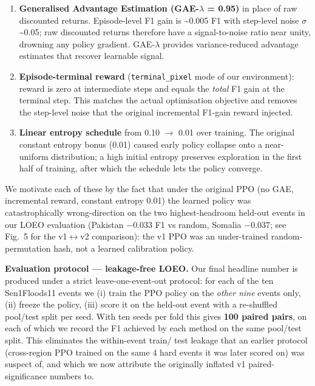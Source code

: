 \documentclass[sn-nature,lineno]{sn-jnl}
\providecommand{\tightlist}{\setlength{\itemsep}{0pt}\setlength{\parskip}{0pt}}
\theoremstyle{thmstyleone}
\theoremstyle{thmstyletwo}
\theoremstyle{thmstylethree}
\begin{document}
\begin{enumerate}
\def\labelenumi{\arabic{enumi}.}
\tightlist
\item
  \textbf{Generalised Advantage Estimation (GAE-$\lambda$ = 0.95)} \cite{schulman2016gae} in place of raw
  discounted returns. Episode-level F1 gain is \textasciitilde0.005 F1 with step-level
  noise $\sigma$ \textasciitilde0.05; raw discounted returns therefore have a signal-to-noise
  ratio near unity, drowning any policy gradient. GAE-$\lambda$ provides
  variance-reduced advantage estimates that recover learnable signal.
\item
  \textbf{Episode-terminal reward} (\texttt{terminal\_pixel} mode of our environment):
  reward is zero at intermediate steps and equals the \emph{total} F1 gain at
  the terminal step. This matches the actual optimisation objective and
  removes the step-level noise that the original incremental F1-gain
  reward injected.
\item
  \textbf{Linear entropy schedule} from 0.10 $\rightarrow$ 0.01 over training. The original
  constant entropy bonus (0.01) caused early policy collapse onto a
  near-uniform distribution; a high initial entropy preserves exploration
  in the first half of training, after which the schedule lets the policy
  converge.
\end{enumerate}

We motivate each of these by the fact that under the original PPO (no GAE,
incremental reward, constant entropy 0.01) the learned policy was
catastrophically wrong-direction on the two highest-headroom held-out events
in our LOEO evaluation (Pakistan $-$0.033 F1 vs random, Somalia $-$0.037; see
Fig.~5 for the v1$\leftrightarrow$v2 comparison): the v1 PPO was an
under-trained random-permutation hash, not a learned calibration policy.

\textbf{Evaluation protocol --- leakage-free LOEO.} Our final headline number is
produced under a strict leave-one-event-out protocol: for each of the ten
Sen1Floods11 events we (i) train the PPO policy on the \emph{other nine} events
only, (ii) freeze the policy, (iii) score it on the held-out event with a
re-shuffled pool/test split per seed. With ten seeds per fold this gives
\textbf{100 paired pairs}, on each of which we record the F1 achieved by each
method on the same pool/test split. This eliminates the within-event train/
test leakage that an earlier protocol (cross-region PPO trained on the same
4 hard events it was later scored on) was suspect of, and which we now
attribute the originally inflated v1 paired-significance numbers to.
\end{document}

